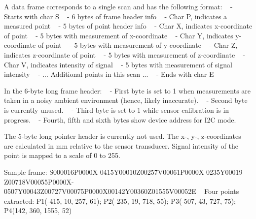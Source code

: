 A data frame corresponds to a single scan and has the following format\+: ~\newline
 -\/ Starts with char \textquotesingle{}S\textquotesingle{} ~\newline
 -\/ 6 bytes of frame header info ~\newline
 -\/ Char \textquotesingle{}P\textquotesingle{}, indicates a measured point ~\newline
 -\/ 5 bytes of point header info ~\newline
 -\/ Char \textquotesingle{}X\textquotesingle{}, indicates x-\/coordinate of point ~\newline
 -\/ 5 bytes with measurement of x-\/coordinate ~\newline
 -\/ Char \textquotesingle{}Y\textquotesingle{}, indicates y-\/coordinate of point ~\newline
 -\/ 5 bytes with measurement of y-\/coordinate ~\newline
 -\/ Char \textquotesingle{}Z\textquotesingle{}, indicates z-\/coordinate of point ~\newline
 -\/ 5 bytes with measurement of z-\/coordinate ~\newline
 -\/ Char \textquotesingle{}V\textquotesingle{}, indicates intensity of signal ~\newline
 -\/ 5 bytes with measurement of signal intensity ~\newline
 -\/ ... Additional points in this scan ... ~\newline
 -\/ Ends with char \textquotesingle{}E\textquotesingle{}

In the 6-\/byte long frame header\+: ~\newline
 -\/ First byte is set to 1 when measurements are taken in a noisy ambient environment (hence, likely inaccurate). ~\newline
 -\/ Second byte is currently unused. ~\newline
 -\/ Third byte is set to 1 while sensor calibration is in progress. ~\newline
 -\/ Fourth, fifth and sixth bytes show device address for I2C mode.

The 5-\/byte long pointer header is currently not used. The x-\/, y-\/, z-\/coordinates are calculated in mm relative to the sensor transducer. Signal intensity of the point is mapped to a scale of 0 to 255.

Sample frame\+: S000016\+P0000\+X-\/0415\+Y00010\+Z00257\+V00061\+P0000\+X-\/0235\+Y00019 Z00718\+V00055\+P0000\+X-\/0507\+Y00043\+Z00727\+V00075\+P0000\+X00142\+Y00360\+Z01555\+V00052E ~\newline
 Four points extracted\+: P1(-\/415, 10, 257, 61); P2(-\/235, 19, 718, 55); P3(-\/507, 43, 727, 75); P4(142, 360, 1555, 52) \mbox{\label{classtoposens__driver_1_1Sensor_ab60154cabae56a4ab05230b4fd6222dd}} 
